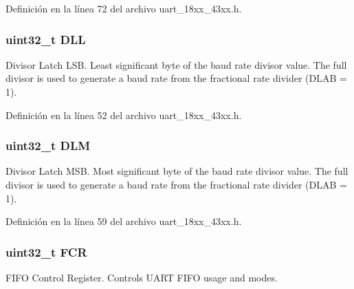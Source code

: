 Definición en la línea 72 del archivo uart\+\_\+18xx\+\_\+43xx.\+h.

\subsubsection[{\texorpdfstring{D\+LL}{DLL}}]{ uint32\+\_\+t D\+LL}\hypertarget{struct_l_p_c___u_s_a_r_t___t_ae2249b8b2ab54c7bd62ee83cd78f9bca}{}\label{struct_l_p_c___u_s_a_r_t___t_ae2249b8b2ab54c7bd62ee83cd78f9bca}
Divisor Latch L\+SB. Least significant byte of the baud rate divisor value. The full divisor is used to generate a baud rate from the fractional rate divider (D\+L\+AB = 1). 

Definición en la línea 52 del archivo uart\+\_\+18xx\+\_\+43xx.\+h.

\subsubsection[{\texorpdfstring{D\+LM}{DLM}}]{ uint32\+\_\+t D\+LM}\hypertarget{struct_l_p_c___u_s_a_r_t___t_abee9a1f3f48fd193f59f8a85a11d0462}{}\label{struct_l_p_c___u_s_a_r_t___t_abee9a1f3f48fd193f59f8a85a11d0462}
Divisor Latch M\+SB. Most significant byte of the baud rate divisor value. The full divisor is used to generate a baud rate from the fractional rate divider (D\+L\+AB = 1). 

Definición en la línea 59 del archivo uart\+\_\+18xx\+\_\+43xx.\+h.

\subsubsection[{\texorpdfstring{F\+CR}{FCR}}]{ uint32\+\_\+t F\+CR}\hypertarget{struct_l_p_c___u_s_a_r_t___t_a29e4c904f59eeaca0d80186f3b36dedf}{}\label{struct_l_p_c___u_s_a_r_t___t_a29e4c904f59eeaca0d80186f3b36dedf}
F\+I\+FO Control Register. Controls U\+A\+RT F\+I\+FO usage and modes. 

